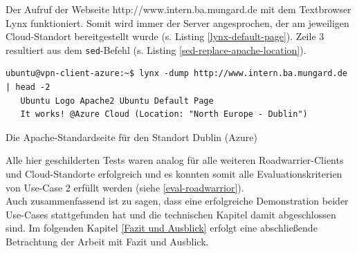 Der Aufruf der Webseite \glqq http://www.intern.ba.mungard.de\grqq{} mit dem Textbrowser Lynx funktioniert. Somit wird immer der Server angesprochen, der am jeweiligen Cloud-Standort bereitgestellt wurde (s. Listing \ref{lynx-default-page}). Zeile 3 resultiert aus dem \texttt{sed}-Befehl (s. Listing \ref{sed-replace-apache-location}).
\begin{listing}[h]
\begin{verbatim}
ubuntu@vpn-client-azure:~$ lynx -dump http://www.intern.ba.mungard.de | head -2
   Ubuntu Logo Apache2 Ubuntu Default Page
   It works! @Azure Cloud (Location: "North Europe - Dublin")

\end{verbatim}
\caption{Die Apache-Standardseite für den Standort Dublin (Azure)}
\label{lynx-default-page}
\end{listing}\FloatBarrier
Alle hier geschilderten Tests waren analog für alle weiteren Roadwarrier-\gls{Client}s und Cloud-Standorte erfolgreich und es konnten somit alle Evaluationskriterien von Use-Case 2 erfüllt werden (siehe \ref{eval-roadwarrior}).\\
Auch zusammenfassend ist zu sagen, dass eine erfolgreiche Demonstration beider Use-Cases stattgefunden hat und die technischen Kapitel damit abgeschlossen sind. Im folgenden Kapitel \ref{Fazit und Ausblick} erfolgt eine abschließende Betrachtung der Arbeit mit Fazit und Ausblick.
